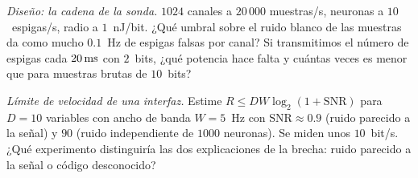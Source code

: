 \begin{exercise}[\lvlB]
\label{ex:17:6}
\emph{Diseño: la cadena de la sonda.} $1024$ canales a $20\,000$ muestras/s, neuronas a $10$~espigas/s, radio a $1$~nJ/bit. ¿Qué umbral sobre el ruido blanco de las muestras da como mucho $0.1$~Hz de espigas falsas por canal? Si transmitimos el número de espigas cada $20\,\text{ms}$ con $2$~bits, ¿qué potencia hace falta y cuántas veces es menor que para muestras brutas de $10$~bits?
\end{exercise}

\begin{exercise}[\lvlC]
\label{ex:17:7}
\emph{Límite de velocidad de una interfaz.} Estime $R\le DW\log_2(1+\text{SNR})$ para $D=10$ variables con ancho de banda $W=5$~Hz con $\text{SNR}\approx0.9$ (ruido parecido a la señal) y $90$ (ruido independiente de $1000$ neuronas). Se miden unos $10$~bit/s. ¿Qué experimento distinguiría las dos explicaciones de la brecha: ruido parecido a la señal o código desconocido?
\end{exercise}

